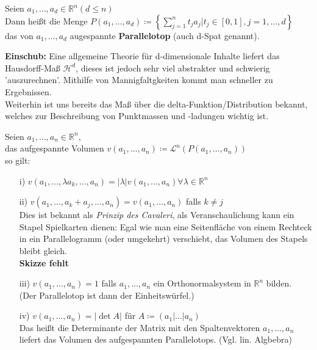 \begin{definition}
    Seien $a_1, \ldots, a_d \in \mathbb{R}^n (d \leq n)$ \\
    Dann heißt die Menge
    $P \left( a_1, \ldots, a_d \right) \coloneqq 
    \left\lbrace 
    \sum\limits_{j=1}^n t_j a_j | t_j \in [0,1], j = 1, \ldots, d    
    \right\rbrace$ \\
    das von $a_1, \ldots, a_d $ augespannte \textbf{Parallelotop} (auch d-Spat genannt).
\end{definition}

\textbf{Einschub:} Eine allgemeine Theorie für d-dimensionale Inhalte liefert das
Hausdorff-Maß $\mathcal{H}^d$, dieses ist jedoch sehr viel abstrakter und schwierig 
'auszurechnen'. Mithilfe von Mannigfaltgkeiten kommt man schneller zu Ergebnissen. \\
Weiterhin ist uns bereits das Maß über die delta-Funktion/Distribution bekannt, welches
zur Beschreibung von Punktmassen und -ladungen wichtig ist.

\begin{satz}
    \mbox{}
    Seien $a_1, \ldots, a_n \in \mathbb{R}^n$, \\
    das aufgespannte Volumen 
    $v(a_1, \ldots , a_n) \coloneqq \mathcal{L}^n (P (a_1, \ldots, a_n))$ \\
    so gilt:
    \begin{enumerate}
        \item[i)]
            $v(a_1, \ldots, \lambda a_k, \ldots, a_n) = 
            |\lambda| v(a_1, \ldots, a_n) \forall \lambda \in \mathbb{R}^n $
        \item[ii)]
            $v(a_1, \ldots, a_k + a_j, \ldots, a_n) = v(a_1, \ldots, a_n) $
            falls $k \neq j $ \\
            Dies ist bekannt als \textit{Prinzip des Cavaleri}, als Veranschaulichung kann
            ein Stapel Spielkarten dienen: Egal wie man eine Seitenfläche von einem Rechteck
            in ein Parallelogramm (oder umgekehrt) verschiebt, 
            das Volumen des Stapels bleibt gleich. \\
            \textbf{Skizze fehlt}
        \item[iii)]
            $v(a_1, \ldots, a_n) = 1 $ falls $a_1, \ldots, a_n $ ein Orthonormalsystem
            in $\mathbb{R}^n $ bilden. \\
            (Der Parallelotop ist dann der Einheitswürfel.)
        \item[iv)]
            $v(a_1, \ldots, a_n) = |\det A|$ für $A \coloneqq (a_1 | \ldots | a_n) $ \\
            Das heißt die Determinante der Matrix mit den Spaltenvektoren $a_1, \ldots, a_n$
            liefert das Volumen des aufgespannten Parallelotops. (Vgl. lin. Algbebra)
    \end{enumerate}
\end{satz}

